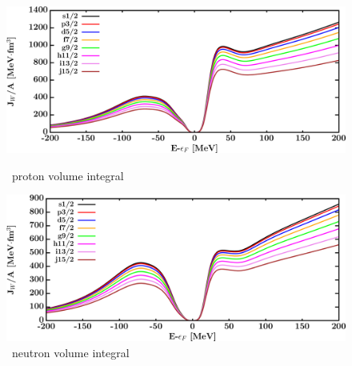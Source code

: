 \begin{figure}[hbtp]
    \centering
    \begin{minipage}{0.42\textwidth}
        \centering
        \includegraphics[width=\textwidth]{figures/sn124_protonVolumeIntegrals.png}
        \caption*{\snFour\ proton volume integral}
        \label{DOMFitData_sn124_proton_potentialIntegral}
    \end{minipage}\hspace{6pt}
    \begin{minipage}{0.42\textwidth}
        \centering
        \includegraphics[width=\textwidth]{figures/sn124_neutronVolumeIntegrals.png}
        \caption*{\snFour\ neutron volume integral}
        \label{DOMFitData_sn124_neutron_potentialIntegral}
    \end{minipage}
\end{figure}

